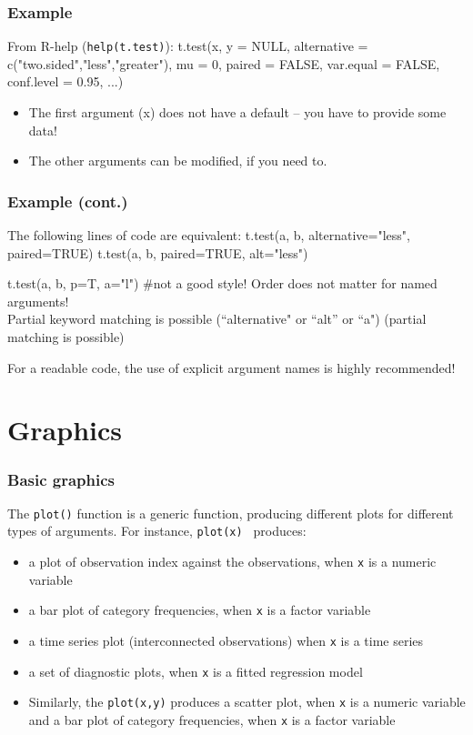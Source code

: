 \documentclass[xcolor=svgnames,handout]{beamer}
\newcommand{\code}[1]{\texttt{#1}}
\let\overbatim\verbatim
\let\endoverbatim\endverbatim
\newenvironment{vcode}%
{\bgroup\baselineskip=0.8\baselineskip\overbatim}%
{\endoverbatim\egroup}
\begin{document}
\begin{frame}[fragile]
\frametitle{Example}
From R-help (\code{help(t.test)}):
\begin{vcode}
t.test(x, y = NULL,
   alternative = c("two.sided","less","greater"),
   mu = 0, paired = FALSE, var.equal = FALSE,
   conf.level = 0.95, ...)
\end{vcode}
  \begin{itemize}
\item The first argument (x) does not have a default -- you have to provide some data!
\item The other arguments can be modified, if you need to.
  \end{itemize}
  \end{frame}

\begin{frame}[fragile]
\frametitle{Example (cont.)}
The following lines of code are equivalent:
\begin{vcode}
t.test(a, b,  alternative="less", paired=TRUE)
t.test(a, b, paired=TRUE, alt="less")

t.test(a, b, p=T, a="l")   #not a good style!
\end{vcode}
Order does not matter for named arguments! \\ 
Partial keyword matching is possible (``alternative" or ``alt'' or ``a") (partial matching is possible) 

\alert{For a readable code, the use of explicit argument names is highly recommended!}
\end{frame}

\section{Graphics}
\begin{frame}[fragile]
\frametitle{Basic graphics}
The \code{plot()} function is a generic function, producing different plots for different types of arguments. For instance, \code{plot(x) } produces:
\begin{itemize}
\item a plot of observation index against the observations, when \code{x} is a numeric variable %
\item a bar plot of category frequencies, when \code{x} is a factor variable
\item a time series plot (interconnected observations) when \code{x} is a time series
\item a set of diagnostic plots, when  \code{x} is a fitted regression model
\item Similarly, the \code{plot(x,y)} produces a scatter plot, when \code{x} is a numeric variable
and a bar plot of category frequencies, when \code{x} is a factor variable
\end{itemize}
\end{frame}
\end{document}
